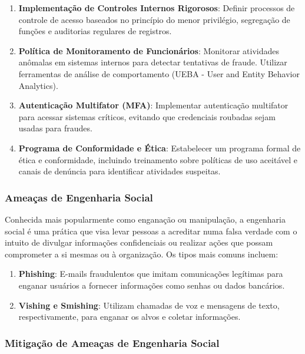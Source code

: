 \documentclass[12pt,oneside,a4paper,article]{abntex2}
\begin{document}
\begin{enumerate}
    \item \textbf{Implementação de Controles Internos Rigorosos}: Definir processos de controle de acesso baseados no princípio do menor privilégio, segregação de funções e auditorias regulares de registros.
    
    \item \textbf{Política de Monitoramento de Funcionários}: Monitorar atividades anômalas em sistemas internos para detectar tentativas de fraude. Utilizar ferramentas de análise de comportamento (UEBA - User and Entity Behavior Analytics).
    
    \item \textbf{Autenticação Multifator (MFA)}: Implementar autenticação multifator para acessar sistemas críticos, evitando que credenciais roubadas sejam usadas para fraudes.
    
    \item \textbf{Programa de Conformidade e Ética}: Estabelecer um programa formal de ética e conformidade, incluindo treinamento sobre políticas de uso aceitável e canais de denúncia para identificar atividades suspeitas.
\end{enumerate}

\subsubsection{\textbf{Ameaças de Engenharia Social}}

Conhecida mais popularmente como enganação ou manipulação, a engenharia social é uma prática que visa levar pessoas a acreditar numa falsa verdade com o intuito de divulgar informações confidenciais ou realizar ações que possam comprometer a si mesmas ou à organização. Os tipos mais comuns incluem:

\begin{enumerate}
    \item \textbf{Phishing}: E-mails fraudulentos que imitam comunicações legítimas para enganar usuários a fornecer informações como senhas ou dados bancários.

    \item \textbf{Vishing e Smishing}: Utilizam chamadas de voz e mensagens de texto, respectivamente, para enganar os alvos e coletar informações.
\end{enumerate}

\subsubsection{\textbf{Mitigação de Ameaças de Engenharia Social}}
\end{document}

